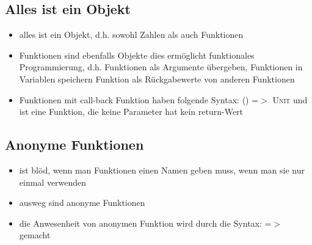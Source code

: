 \subsection{Alles ist ein Objekt}
\begin{itemize}
  \item alles ist ein Objekt, d.h. sowohl Zahlen als auch Funktionen
\end{itemize}




\begin{itemize}
  \item Funktionen sind ebenfalls Objekte \und dies ermöglicht funktionales
  Programmierung, d.h. Funktionen als Argumente übergeben, Funktionen in
  Variablen speichern \und Funktion als Rückgabewerte von anderen Funktionen
  \item Funktionen mit call-back Funktion haben folgende Syntax: 
  \textsc{() =$>$ Unit} und ist eine Funktion, die keine Parameter hat \und 
  kein return-Wert
  
  
\end{itemize}


\subsection{Anonyme Funktionen}
\begin{itemize}
  \item ist blöd, wenn man Funktionen einen Namen geben muss, wenn man sie
  nur einmal verwenden
  \item ausweg sind anonyme Funktionen
  \item die Anwesenheit von anonymen Funktion wird durch die Syntax:
  \textsc{=$>$} gemacht
  
  
\end{itemize}



